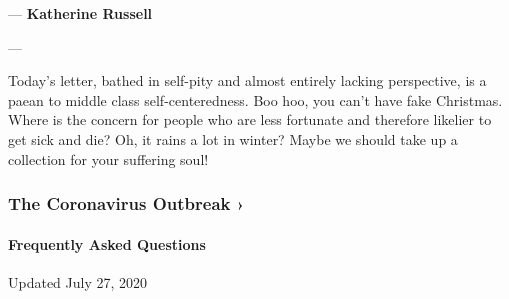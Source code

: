 --- \textbf{Katherine Russell}

---

Today's letter, bathed in self-pity and almost entirely lacking
perspective, is a paean to middle class self-centeredness. Boo hoo, you
can't have fake Christmas. Where is the concern for people who are less
fortunate and therefore likelier to get sick and die? Oh, it rains a lot
in winter? Maybe we should take up a collection for your suffering soul!

\href{https://www.nytimes3xbfgragh.onion/news-event/coronavirus?action=click\&pgtype=Article\&state=default\&region=MAIN_CONTENT_3\&context=storylines_faq}{}

\hypertarget{the-coronavirus-outbreak-}{%
\subsubsection{The Coronavirus Outbreak
›}\label{the-coronavirus-outbreak-}}

\hypertarget{frequently-asked-questions}{%
\paragraph{Frequently Asked
Questions}\label{frequently-asked-questions}}

Updated July 27, 2020

